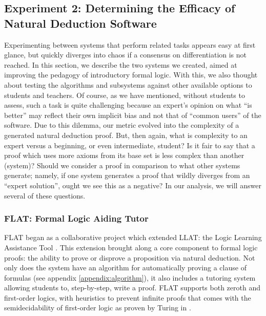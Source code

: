 \documentclass[ms]{uncgdissertationexp2}
\theoremstyle{plain}
\theoremstyle{definition}
\theoremstyle{remark}
\begin{document}
\subsection{Experiment 2: Determining the Efficacy of Natural Deduction Software}
Experimenting between systems that perform related tasks appears easy at first glance, but quickly diverges into chaos if a consensus on differentiation is not reached. In this section, we describe the two systems we created, aimed at improving the pedagogy of introductory formal logic. With this, we also thought about testing the algorithms and subsystems against other available options to students and teachers. Of course, as we have mentioned, without students to assess, such a task is quite challenging because an expert's opinion on what ``is better'' may reflect their own implicit bias and not that of ``common users'' of the software. Due to this dilemma, our metric evolved into the complexity of a generated natural deduction proof. But, then again, what is complexity to an expert versus a beginning, or even intermediate, student? Is it fair to say that a proof which uses more axioms from its base set is less complex than another (system)? Should we consider a proof in comparison to what other systems generate; namely, if one system generates a proof that wildly diverges from an ``expert solution'', ought we see this as a negative? In our analysis, we will answer several of these questions.  

\subsubsection{FLAT: Formal Logic Aiding Tutor} \label{section:flat}
FLAT began as a collaborative project which extended LLAT: the Logic Learning Assistance Tool \cite{llat}. This extension brought along a core component to formal logic proofs: the ability to prove or disprove a proposition via natural deduction. Not only does the system have an algorithm for automatically proving a clause of formulas (see appendix \ref{appendix:algorithm}), it also includes a tutoring system allowing students to, step-by-step, write a proof. FLAT supports both zeroth and first-order logics, with heuristics to prevent infinite proofs that comes with the semidecidability of first-order logic as proven by Turing in \cite{turing}.
\end{document}
